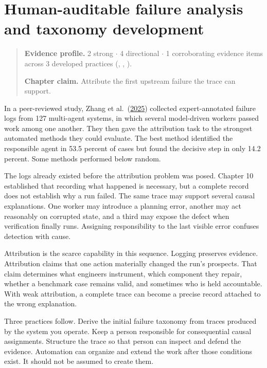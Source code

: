 \chapter{Human-auditable failure analysis and taxonomy development}
\label{ch11-human-auditable-failure-analysis-taxonomy}
\begin{quote}
\textbf{Evidence profile.} 2 strong \(\cdot\) 4 directional \(\cdot\) 1 corroborating evidence items across 3 developed practices (, , ).

\textbf{Chapter claim.} Attribute the first upstream failure the trace can support.
\end{quote}

In a peer-reviewed study, Zhang et al.~(\href{https://arxiv.org/abs/2505.00212}{2025}) collected expert-annotated failure logs from 127 multi-agent systems, in which several model-driven workers passed work among one another. They then gave the attribution task to the strongest automated methods they could evaluate. The best method identified the responsible agent in 53.5 percent of cases but found the decisive step in only 14.2 percent. Some methods performed below random.

The logs already existed before the attribution problem was posed. Chapter 10 established that recording what happened is necessary, but a complete record does not establish why a run failed. The same trace may support several causal explanations. One worker may introduce a planning error, another may act reasonably on corrupted state, and a third may expose the defect when verification finally runs. Assigning responsibility to the last visible error confuses detection with cause.

Attribution is the scarce capability in this sequence. Logging preserves evidence. Attribution claims that one action materially changed the run's prospects. That claim determines what engineers instrument, which component they repair, whether a benchmark case remains valid, and sometimes who is held accountable. With weak attribution, a complete trace can become a precise record attached to the wrong explanation.

Three practices follow. Derive the initial failure taxonomy from traces produced by the system you operate. Keep a person responsible for consequential causal assignments. Structure the trace so that person can inspect and defend the evidence. Automation can organize and extend the work after those conditions exist. It should not be assumed to create them.

